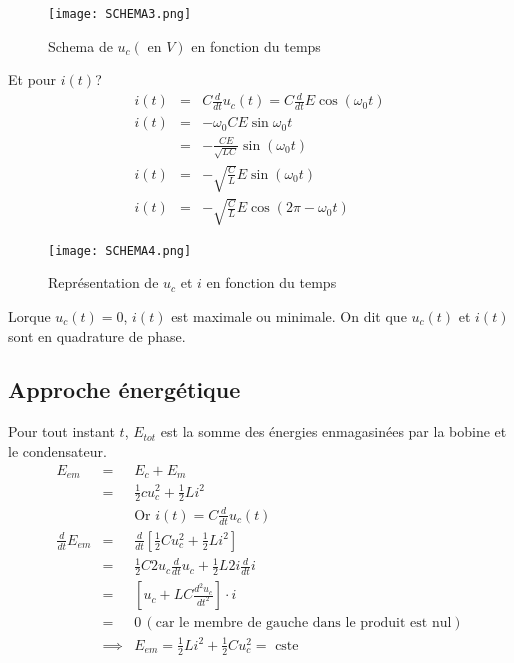 \begin{figure}[!htb]
    \centering
    \texttt{[image: SCHEMA3.png]}
    \caption{Schema de \(u_{c} (\text{ en } \unit{V})\) en fonction du temps }
    \label{fig:SCHEMA3}
\end{figure}


Et pour \(i(t)\)?\\
\begin{eqnarray*}
    i(t) &=& C \frac{d}{dt}u_{c}(t) = C \frac{d}{dt}E\cos (\omega _{0}t)\\
    i(t) &=& -\omega_{0}CE\sin \omega_{0}t\\
     &=& -\frac{CE}{\sqrt{LC}} \sin(\omega _{0}t) \\
     i(t) &=& -\sqrt{\frac{C}{L}}E\sin (\omega_{0}t)\\
     i(t) &=& -\sqrt{\frac{C}{L}}E\cos(2\pi-\omega_{0}t) 
\end{eqnarray*}

\begin{figure}[!htb]
    \centering
    \texttt{[image: SCHEMA4.png]}
    \caption{Représentation de \(u_{c}\) et \(i\) en fonction du temps }
    \label{fig:SCHEMA4}
\end{figure}


Lorque \(u_{c}(t) = 0\), \(i(t)\) est maximale ou minimale. On dit que \(u_{c}(t)\) et \(i(t)\) sont en quadrature de phase. 

\subsection{Approche énergétique}

Pour tout instant \(t\), \(E_{tot}\) est la somme des énergies enmagasinées par la bobine et le condensateur.\\
\begin{eqnarray*}
    E_{em} &=& E_{c} + E_{m}\\
    &=& \frac{1}{2}cu_{c}^{2} + \frac{1}{2}Li^{2}\\
    &&\text{Or }i(t) = C\frac{d}{dt}u_{c}(t)\\
    \frac{d}{dt}E_{em} &=& \frac{d}{dt}\left[ \frac{1}{2}Cu_{c}^{2} + \frac{1}{2}Li^{2} \right]\\
    &=& \frac{1}{2} C 2u_{c}\frac{d}{dt}u_{c} + \frac{1}{2}L 2 i \frac{d}{dt}i\\
    &=& \left[ u_{c} + LC \frac{d^{2}u_{c}}{dt^{2}} \right] \cdot i\\
    &=& 0 \,(\text{car le membre de gauche dans le produit est nul})\\
    & \implies& E_{em} = \frac{1}{2}Li^{2} + \frac{1}{2}Cu_{c}^{2} = \text{ cste}
\end{eqnarray*}

